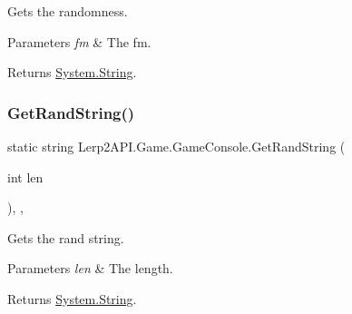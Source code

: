 Gets the randomness. 


\begin{DoxyParams}{Parameters}
{\em fm} & The fm.\\
\hline
\end{DoxyParams}
\begin{DoxyReturn}{Returns}
\hyperlink{namespace_lerp2_a_p_i_1_1_game_a2f182da062f210cc43f341f6992ee293a27118326006d3829667a400ad23d5d98}{System.\+String}.
\end{DoxyReturn}
\mbox{\label{class_lerp2_a_p_i_1_1_game_1_1_game_console_a1f9e983b12a68fd8112d955cf952ae08}} 
\subsubsection{\texorpdfstring{Get\+Rand\+String()}{GetRandString()}}
{\footnotesize\ttfamily static string Lerp2\+A\+P\+I.\+Game.\+Game\+Console.\+Get\+Rand\+String (\begin{DoxyParamCaption}\item[{int}]{len }\end{DoxyParamCaption})\hspace{0.3cm}{\ttfamily [inline]}, {\ttfamily [static]}, {\ttfamily [protected]}}



Gets the rand string. 


\begin{DoxyParams}{Parameters}
{\em len} & The length.\\
\hline
\end{DoxyParams}
\begin{DoxyReturn}{Returns}
\hyperlink{namespace_lerp2_a_p_i_1_1_game_a2f182da062f210cc43f341f6992ee293a27118326006d3829667a400ad23d5d98}{System.\+String}.
\end{DoxyReturn}
\mbox{\label{class_lerp2_a_p_i_1_1_game_1_1_game_console_a75599c8ffeadc3a8e3d6de281cb423f8}} 
